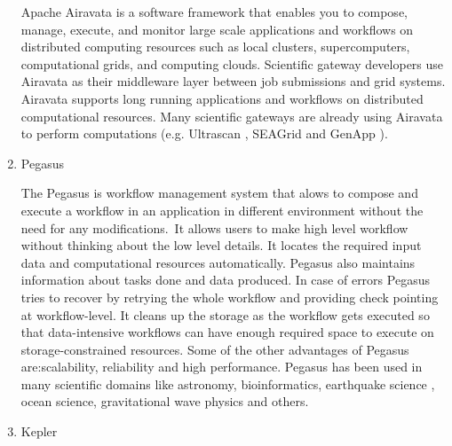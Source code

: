 \begin{enumerate}
Apache Airavata \label{\detokenize{i524/technologies:id5}}{\hyperref[\detokenize{i524/technologies:www-airavata}]{\sphinxcrossref{{[}5{]}}}} is a software framework that
enables you to compose, manage, execute, and monitor large scale
applications and workflows on distributed computing resources such
as local clusters, supercomputers, computational grids, and
computing clouds. Scientific gateway developers use Airavata as
their middleware layer between job submissions and grid
systems. Airavata supports long running applications and workflows
on distributed computational resources. Many scientific gateways
are already using Airavata to perform computations (e.g. Ultrascan
\label{\detokenize{i524/technologies:id6}}{\hyperref[\detokenize{i524/technologies:www-ultrascan}]{\sphinxcrossref{{[}6{]}}}}, SEAGrid \label{\detokenize{i524/technologies:id7}}{\hyperref[\detokenize{i524/technologies:www-seagrid}]{\sphinxcrossref{{[}7{]}}}} and GenApp
\label{\detokenize{i524/technologies:id8}}{\hyperref[\detokenize{i524/technologies:www-genapp}]{\sphinxcrossref{{[}8{]}}}}).

\item {} 
Pegasus

The Pegasus \label{\detokenize{i524/technologies:id9}}{\hyperref[\detokenize{i524/technologies:www-pegasus}]{\sphinxcrossref{{[}9{]}}}} is workflow management system
that alows to compose and execute a workflow in an application
in different environment without the need  for any
modifications. It allows users to make high level workflow
without thinking about the low level details. It locates
the required input data and computational resources automatically.
Pegasus also maintains information about tasks done and data
produced. In case of errors Pegasus tries to recover by retrying
the whole workflow and providing check pointing at workflow-level.
It cleans up the storage as the workflow gets executed so that
data-intensive workflows can have enough required space to execute
on storage-constrained resources. Some of the other advantages of
Pegasus are:scalability, reliability and high performance. Pegasus
has been used in many scientific domains like astronomy,
bioinformatics, earthquake science , ocean science, gravitational
wave physics and others.

\item {} 
Kepler


\end{enumerate}
